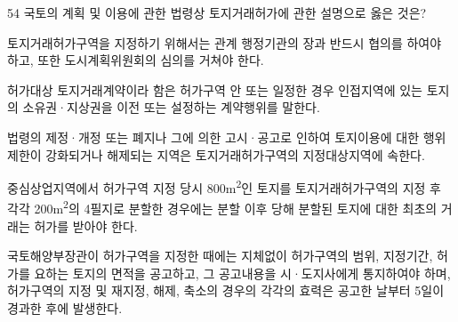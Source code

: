 \begin{question}{54}
국토의 계획 및 이용에 관한 법령상 토지거래허가에 관한 설명으로 옳은 것은?
\begin{choices}
  \item 토지거래허가구역을 지정하기 위해서는 관계 행정기관의 장과 반드시 협의를 하여야 하고, 또한 도시계획위원회의 심의를 거쳐야 한다.
  \item 허가대상 토지거래계약이라 함은 허가구역 안 또는 일정한 경우 인접지역에 있는 토지의 소유권·지상권을 이전 또는 설정하는 계약행위를 말한다.
  \item 법령의 제정·개정 또는 폐지나 그에 의한 고시·공고로 인하여 토지이용에 대한 행위제한이 강화되거나 해제되는 지역은 토지거래허가구역의 지정대상지역에 속한다.
  \item 중심상업지역에서 허가구역 지정 당시 800m\textsuperscript{2}인 토지를 토지거래허가구역의 지정 후 각각 200m\textsuperscript{2}의 4필지로 분할한 경우에는 분할 이후 당해 분할된 토지에 대한 최초의 거래는 허가를 받아야 한다.
  \item 국토해양부장관이 허가구역을 지정한 때에는 지체없이 허가구역의 범위, 지정기간, 허가를 요하는 토지의 면적을 공고하고, 그 공고내용을 시·도지사에게 통지하여야 하며, 허가구역의 지정 및 재지정, 해제, 축소의 경우의 각각의 효력은 공고한 날부터 5일이 경과한 후에 발생한다.
\end{choices}
\end{question}
